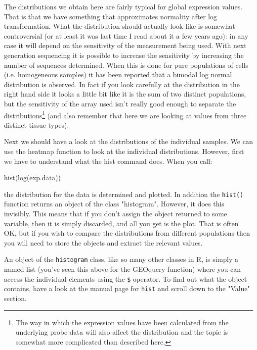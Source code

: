 \documentclass[11pt]{article}
\begin{document}
The distributions we obtain here are fairly typical for global
expression values. That is that we have something that approximates
normality after log transformation. What the distribution should
actually look like is somewhat controversial (or at least it was
last time I read about it a few years ago): in any case it will depend
on the sensitivity of the measurement being used. With next generation
sequencing it is possible to increase the sensitivity by increasing
the number of sequences determined. When this is done for pure populations
of cells (i.e. homogeneous samples) it has been reported that a bimodal
log normal distribution is observed. In fact if you look carefully at
the distribution in the right hand side it looks a little bit like it
is the sum of two distinct populations, but the sensitivity of the
array used isn't really good enough to separate the distributions\footnote{
The way in which the expression values have been calculated from the
underlying probe data will also affect the distribution and the topic is
somewhat more complicated than described here.}
(and also remember that here we are looking at values from three
distinct tissue types).

Next we should have a look at the distributions of the individual
samples. We can use the heatmap function to look at the individual
distributions. However, first we have to understand what the
hist command does. When you call:

\begin{rcode}
  hist(log(exp.data))
\end{rcode}

the distribution for the data is determined and plotted. In addition
the \texttt{hist()} function returns an object of the class "histogram".
However, it does this invisibly. This means that if you don't assign
the object returned to some variable, then it is simply discarded,
and all you get is the plot. That is often OK, but if you wish to 
compare the distributions from different populations then you will
need to store the objects and extract the relevant values.

An object of the \texttt{histogram} class, like so many other classes
in R, is simply a named list (you've seen this above for the GEOquery
function) where you can access the individual elements using the \texttt{\$}
operator. To find out what the object contains, have a look at the 
manual page for \texttt{hist} and scroll down to the "Value" section.
\end{document}
